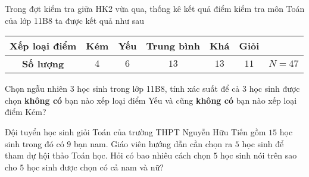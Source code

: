 \begin{bt}%
	Trong đợt kiểm tra giữa HK2 vừa qua, thống kê kết quả điểm kiểm tra môn Toán của lớp 11B8 ta được kết quả như sau
	\begin{center}
		\begin{tabular}{|c|c|c|c|c|c|c|}
			\hline
			\textbf{Xếp loại điểm}& Kém & Yếu & Trung bình & Khá & Giỏi &\\
			\hline
			\textbf{Số lượng} & $4$& $6$ &$13$& $13$ & $11$ & $N=47$\\
			\hline
		\end{tabular}
	\end{center}
	Chọn ngẫu nhiên $3$ học sinh trong lớp 11B8, tính xác suất để cả $3$ học sinh được chọn \textbf{không có} bạn nào xếp loại điểm Yếu và cũng \textbf{không có} bạn nào xếp loại điểm Kém?
\end{bt}

\begin{bt}%
	Đội tuyển học sinh giỏi Toán của trường THPT Nguyễn Hữu Tiến gồm $15$ học sinh trong đó có $9$ bạn nam. Giáo viên hướng dẫn cần chọn ra $5$ học sinh để tham dự hội thảo Toán học. Hỏi có bao nhiêu cách chọn $5$ học sinh nói trên sao cho $5$ học sinh được chọn có cả nam và nữ?
\end{bt}



